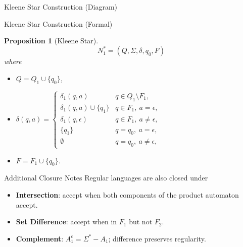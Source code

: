 \documentclass[aspectratio=169]{beamer}
\newtheorem{proposition}{Proposition}
\begin{document}
\begin{frame}{Kleene Star Construction (Diagram)}
  \begin{center}
  \end{center}
\end{frame}

\begin{frame}{Kleene Star Construction (Formal)}
  \begin{proposition}[Kleene Star]
    \[
      N_1^* = (Q,\Sigma,\delta,q_0,F)
    \]
    where
    \begin{itemize}
      \item $Q = Q_1 \cup \{q_0\}$,
      \item $\delta(q,a) =
        \begin{cases}
          \delta_1(q,a) & q \in Q_1 \setminus F_1, \\
          \delta_1(q,a) \cup \{q_1\} & q \in F_1,\ a = \epsilon, \\
          \delta_1(q,\epsilon) & q \in F_1,\ a \neq \epsilon, \\
          \{q_1\} & q = q_0,\ a = \epsilon, \\
          \emptyset & q = q_0,\ a \neq \epsilon,
        \end{cases}$
      \item $F = F_1 \cup \{q_0\}$.
    \end{itemize}
  \end{proposition}
\end{frame}

\begin{frame}{Additional Closure Notes}
  Regular languages are also closed under
  \begin{itemize}
    \item \textbf{Intersection}: accept when both components of the product automaton accept.
    \item \textbf{Set Difference}: accept when in $F_1$ but not $F_2$.
    \item \textbf{Complement}: $A_1^c = \Sigma^* - A_1$; difference preserves regularity.
  \end{itemize}
\end{frame}
\end{document}
